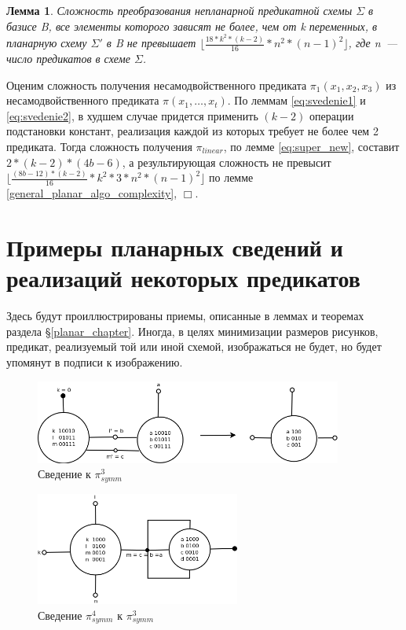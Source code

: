\documentclass[12pt]{extarticle}
\newtheorem{lemma}[theorem]{Лемма}
\newenvironment{proof}[1][Доказательство.]{\begin{trivlist}
\item[\hskip \labelsep {\bfseries #1}]}{\end{trivlist}}
\begin{document}
\begin{lemma}
Сложность преобразования непланарной предикатной схемы $\Sigma$ в базисе B, 
все элементы которого зависят не более, чем от k переменных, 
в планарную схему $\Sigma'$ в B не превышает $\lfloor \frac{18 * k^2 * (k-2)}{16} * n^2 * (n-1)^2 \rfloor$, где n~--- число предикатов в схеме $\Sigma$.
\end{lemma}
\begin{proof}
Оценим сложность получения несамодвойственного предиката $\pi_1(x_1, x_2, x_3)$ из несамодвойственного предиката
$\pi(x_1, \dots, x_t)$. По леммам \ref{eq:svedenie1} и \ref{eq:svedenie2}, в худшем случае придется применить $(k-2)$ 
операции подстановки констант, реализация каждой из которых требует не более чем 2 предиката.
Тогда сложность получения $\pi_{linear}$, по лемме \ref{eq:super_new}, составит $2 * (k-2) * (4b - 6)$, а
результирующая сложность не превысит $\lfloor \frac{(8b - 12) * (k-2)}{16} * k^2 * 3 * n^2 * (n-1)^2 \rfloor $ по лемме 
\ref{general_planar_algo_complexity}, $\Box$.
\end{proof}

\clearpage
\section{Примеры планарных сведений и реализаций некоторых предикатов}
Здесь будут проиллюстрированы приемы, описанные в леммах и теоремах раздела \S \ref{planar_chapter}. 
Иногда, в целях минимизации размеров рисунков, предикат, реализуемый той или иной схемой, изображаться не будет, 
но будет упомянут в подписи к изображению.

\begin{figure}[htb]
\centering
\includegraphics[width=0.9\textwidth]{3_2to3.png}
\caption{Сведение к $\pi_{symm}^3$ }
\label{fig:3_2to3}
\end{figure}

\begin{figure}[htb]
 \centering
\includegraphics[width=0.6\textwidth]{4to3.png}
\caption{Сведение $\pi_{symm}^4$ к $\pi_{symm}^3$ }
\label{fig:4to3}
\end{figure}
\end{document}

